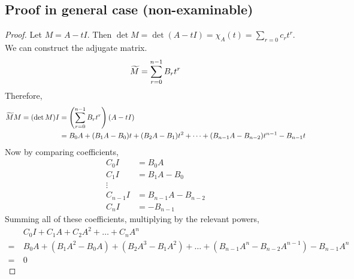\subsection{Proof in general case (non-examinable)}
\begin{proof}
	Let \(M = A - tI\).
	Then \(\det M = \det(A - tI) = \chi_A(t) = \sum_{r=0}c_r t^r\).
	We can construct the adjugate matrix.
	\[
		\widetilde{M} = \sum_{r=0}^{n-1} B_r t^r
	\]
	Therefore,
	\begin{align*}
		\widetilde{M} M = (\det M) I & = \left(\sum_{r=0}^{n-1} B_r t^r\right)(A-tI)                                             \\
		                           & = B_0A + (B_1A - B_0)t + (B_2A - B_1)t^2 + \dots + (B_{n-1}A - B_{n-2})t^{n-1} - B_{n-1}t
	\end{align*}
	Now by comparing coefficients,
	\begin{align*}
		C_0I     & = B_0A               \\
		C_1I     & = B_1A - B_0         \\
		\vdots                          \\
		C_{n-1}I & = B_{n-1}A - B_{n-2} \\
		C_n I    & = -B_{n-1}
	\end{align*}
	Summing all of these coefficients, multiplying by the relevant powers,
	\begin{align*}
		 & C_0I + C_1A + C_2A^2 + \dots + C_n A^n \\=\ &B_0A + (B_1A^2 - B_0A) + (B_2A^3 - B_1A^2) + \dots + (B_{n-1}A^n - B_{n-2}A^{n-1}) - B_{n-1}A^n \\=\ &0
	\end{align*}
\end{proof}

